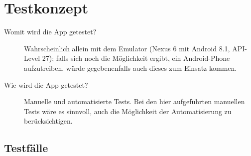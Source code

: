 \documentclass[12pt,a4paper]{scrartcl}
\begin{document}
\section{Testkonzept}


\begin{description}
  \item [Womit wird die App getestet?] Wahrscheinlich allein mit dem Emulator (Nexus 6 mit Android 8.1, API-Level 27); falls sich noch die Möglichkeit ergibt, ein Android-Phone aufzutreiben, würde gegebenenfalls auch dieses zum Einsatz kommen.
  \item [Wie wird die App getestet?] Manuelle und automatisierte Tests. Bei den hier aufgeführten manuellen Tests wäre es sinnvoll, auch die Möglichkeit der Automatisierung zu berücksichtigen.
\end{description}

\subsection{Testfälle}
\end{document}
